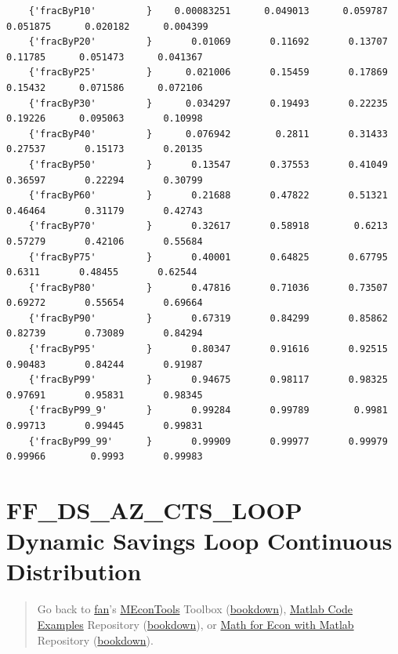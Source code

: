 \documentclass[
]{book}
\begin{document}
\begin{verbatim}
    {'fracByP10'         }    0.00083251      0.049013      0.059787      0.051875      0.020182      0.004399 
    {'fracByP20'         }       0.01069       0.11692       0.13707       0.11785      0.051473      0.041367 
    {'fracByP25'         }      0.021006       0.15459       0.17869       0.15432      0.071586      0.072106 
    {'fracByP30'         }      0.034297       0.19493       0.22235       0.19226      0.095063       0.10998 
    {'fracByP40'         }      0.076942        0.2811       0.31433       0.27537       0.15173       0.20135 
    {'fracByP50'         }       0.13547       0.37553       0.41049       0.36597       0.22294       0.30799 
    {'fracByP60'         }       0.21688       0.47822       0.51321       0.46464       0.31179       0.42743 
    {'fracByP70'         }       0.32617       0.58918        0.6213       0.57279       0.42106       0.55684 
    {'fracByP75'         }       0.40001       0.64825       0.67795        0.6311       0.48455       0.62544 
    {'fracByP80'         }       0.47816       0.71036       0.73507       0.69272       0.55654       0.69664 
    {'fracByP90'         }       0.67319       0.84299       0.85862       0.82739       0.73089       0.84294 
    {'fracByP95'         }       0.80347       0.91616       0.92515       0.90483       0.84244       0.91987 
    {'fracByP99'         }       0.94675       0.98117       0.98325       0.97691       0.95831       0.98345 
    {'fracByP99_9'       }       0.99284       0.99789        0.9981       0.99713       0.99445       0.99831 
    {'fracByP99_99'      }       0.99909       0.99977       0.99979       0.99966        0.9993       0.99983
\end{verbatim}

\hypertarget{ff_ds_az_cts_loop-dynamic-savings-loop-continuous-distribution}{%
\section{FF\_DS\_AZ\_CTS\_LOOP Dynamic Savings Loop Continuous Distribution}\label{ff_ds_az_cts_loop-dynamic-savings-loop-continuous-distribution}}

\begin{quote}
Go back to \href{http://fanwangecon.github.io/}{fan}'s \href{https://fanwangecon.github.io/MEconTools/}{MEconTools} Toolbox (\href{https://fanwangecon.github.io/MEconTools/bookdown}{bookdown}), \href{https://fanwangecon.github.io/M4Econ/}{Matlab Code Examples} Repository (\href{https://fanwangecon.github.io/M4Econ/bookdown}{bookdown}), or \href{https://fanwangecon.github.io/Math4Econ/}{Math for Econ with Matlab} Repository (\href{https://fanwangecon.github.io/Math4Econ/bookdown}{bookdown}).
\end{quote}
\end{document}
